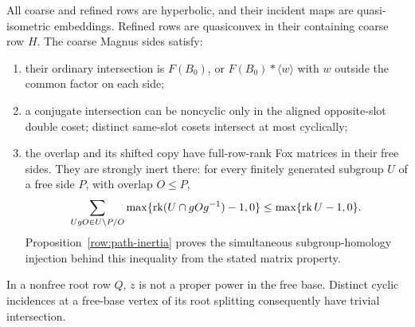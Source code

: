 \begin{lemma}\label{row:geometry}
All coarse and refined rows are hyperbolic, and their incident maps
are quasi-isometric embeddings. Refined rows are quasiconvex in their
containing coarse row \(H\). The coarse Magnus sides satisfy:
\begin{enumerate}[label=(\roman*)]
\item their ordinary intersection is \(F(B_0)\), or
\(F(B_0)*\langle w\rangle\) with \(w\) outside the common factor on
each side;
\item a conjugate intersection can be noncyclic only in the aligned
opposite-slot double coset; distinct same-slot cosets intersect at
most cyclically;
\item the overlap and its shifted copy have full-row-rank Fox matrices
in their free sides. They are strongly inert there: for every
finitely generated subgroup \(U\) of a free side \(P\), with overlap
\(O\le P\),
\[
 \sum_{UgO\in U\backslash P/O}
 \max\{\operatorname{rk}(U\cap gOg^{-1})-1,0\}
 \le \max\{\operatorname{rk} U-1,0\}.
\]
Proposition~\ref{row:path-inertia} proves the simultaneous
subgroup-homology injection behind this inequality from the stated
matrix property.
\end{enumerate}
In a nonfree root row \(Q\), \(z\) is not a proper power in the free
base. Distinct cyclic incidences at a free-base vertex of its root
splitting consequently have trivial intersection.
\end{lemma}

